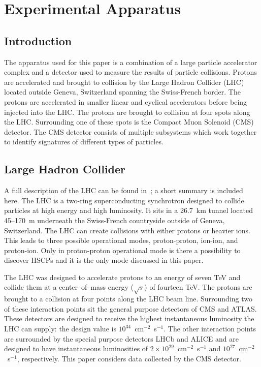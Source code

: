 \chapter{Experimental Apparatus \label{sec:app}}

\section{Introduction}

The apparatus used for this paper is a combination of a large particle accelerator complex and a detector used to measure the results of particle collisions.
Protons are accelerated and brought to collision by the Large Hadron Collider (LHC)
located outside Geneva, Switzerland spanning the Swiss-French border. The protons are accelerated in smaller linear and cyclical accelerators before being injected
into the LHC. The protons are brought to collision at four spots along the LHC. Surrounding one of these spots is the Compact Muon Solenoid (CMS) detector. The CMS
detector consists of multiple subsystems which work together to identify signatures of different types of particles.

\section{Large Hadron Collider \label{sec:LHC}}
A full description of the LHC can be found in~\cite{1748-0221-3-08-S08001}; a short summary is included here.
The LHC is a two-ring superconducting synchrotron designed
to collide particles at high energy and high luminosity. It sits in a 26.7~km tunnel located 45--170~m underneath the Swiss-French countryside outside of Geneva, Switzerland.
The LHC can create collisions with either protons or heavier ions. This leads to three possible operational modes, proton-proton, ion-ion, and proton-ion.
Only in proton-proton operational mode is there a possibility to discover HSCPs and it is the only mode discussed in this paper.

The LHC was designed to accelerate protons to an energy of seven TeV and collide them at a center--of--mass energy ($\sqrt{s}$) of 
fourteen TeV. The protons are brought
to a collision at four points along the LHC beam line. Surrounding two of these interaction points sit the general purpose detectors of CMS and ATLAS. These detectors are 
designed to receive the highest instantaneous luminosity the LHC can supply: the design value is $10^{34}$~cm$^{-2}$~s$^{-1}$.
The other interaction points are surrounded by the special purpose detectors LHCb and ALICE and
are designed to have instantaneous luminosities of $2\times10^{29}$~cm$^{-2}$~s$^{-1}$ and $10^{27}$~cm$^{-2}$~s$^{-1}$, respectively. This paper considers data collected by the
CMS detector.

